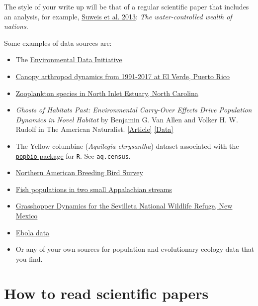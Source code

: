 \documentclass[]{book}
\begin{document}
The style of your write up will be that of a regular scientific paper
that includes an analysis, for example,
\href{https://www.pnas.org/content/110/11/4230}{Suweis et al. 2013}:
\emph{The water-controlled wealth of nations}.

Some examples of data sources are:

\begin{itemize}
\item
  The \href{https://portal.edirepository.org/nis/home.jsp}{Environmental
  Data Initiative}
\item
  \href{https://portal.edirepository.org/nis/metadataviewer?packageid=knb-lter-luq.96.2410865}{Canopy
  arthropod dynamics from 1991-2017 at El Verde, Puerto Rico}
\item
  \href{https://portal.edirepository.org/nis/mapbrowse?packageid=knb-lter-nin.2.1}{Zooplankton
  species in North Inlet Estuary, North Carolina}
\item
  \emph{Ghosts of Habitats Past: Environmental Carry-Over Effects Drive
  Population Dynamics in Novel Habitat} by Benjamin G. Van Allen and
  Volker H. W. Rudolf in The American Naturalist.
  \href{https://www.journals.uchicago.edu/doi/10.1086/670127?mobileUi=0}{{[}Article{]}}
  \href{https://datadryad.org/stash/dataset/doi:10.5061/dryad.t4g3r}{{[}Data{]}}
\item
  The Yellow columbine (\emph{Aquilegia chrysantha}) dataset associated
  with the
  \href{https://cran.r-project.org/web/packages/popbio/index.html}{\texttt{popbio}
  package} for \texttt{R}. See \texttt{aq.census}.
\item
  \href{https://www.pwrc.usgs.gov/BBS/RawData/}{Northern American
  Breeding Bird Survey}
\item
  \href{https://portal.edirepository.org/nis/mapbrowse?packageid=knb-lter-cwt.3026.13}{Fish
  populations in two small Appalachian streams}
\item
  \href{https://portal.edirepository.org/nis/mapbrowse?packageid=knb-lter-sev.106.214968}{Grasshopper
  Dynamics for the Sevilleta National Wildlife Refuge, New Mexico}
\item
  \href{https://apps.who.int/gho/data/node.ebola-sitrep.quick-downloads?lang=en}{Ebola
  data}
\item
  Or any of your own sources for population and evolutionary ecology
  data that you find.
\end{itemize}

\section{How to read scientific
papers}\label{how-to-read-scientific-papers}
\end{document}
